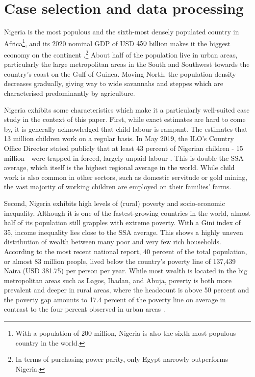 \documentclass[a4paper,12pt]{article}
\theoremstyle{plain}
\theoremstyle{definition}
\theoremstyle{definition}
\theoremstyle{definition}
\theoremstyle{definition}
\begin{document}


\section{Case selection and data processing}
\label{sec:case_selection}

Nigeria is the most populous and the sixth-most densely populated country in Africa\footnote{With a population of 200 million, Nigeria is also the sixth-most populous country in the world.}, and its 2020 nominal GDP of USD $450$ billion makes it the biggest economy on the continent \citep{WorldBank2021}.\footnote{In terms of purchasing power parity, only Egypt narrowly outperforms Nigeria.} About half of the population live in urban areas, particularly the large metropolitan areas in the South and Southwest towards the country's coast on the Gulf of Guinea. Moving North, the population density decreases gradually, giving way to wide savannahs and steppes which are characterised predominantly by agriculture.

Nigeria exhibits some characteristics which make it a particularly well-suited case study in the context of this paper. First, while exact estimates are hard to come by, it is generally acknowledged that child labour is rampant. The \citet{USDepartmentofLabor2021} estimates that 13 million children work on a regular basis. In May 2019, the ILO's Country Office Director stated publicly that at least 43 percent of Nigerian children - 15 million - were trapped in forced, largely unpaid labour \citep{ILO2019}. This is double the SSA average, which itself is the highest regional average in the world. While child work is also common in other sectors, such as domestic servitude or gold mining, the vast majority of working children are employed on their families' farms.

Second, Nigeria exhibits high levels of (rural) poverty and socio-economic inequality. Although it is one of the fastest-growing countries in the world, almost half of its population still grapples with extreme poverty. With a Gini index of 35, income inequality lies close to the SSA average. This shows a highly uneven distribution of wealth between many poor and very few rich households. According to the most recent national report, 40 percent of the total population, or almost 83 million people, lived below the country's poverty line of 137,439 Naira (USD 381.75) per person per year. While most wealth is located in the big metropolitan areas such as Lagos, Ibadan, and Abuja, poverty is both more prevalent and deeper in rural areas, where the headcount is above 50 percent and the poverty gap amounts to 17.4 percent of the poverty line on average in contrast to the four percent observed in urban areas \citep{NBS2020}.
\end{document}
